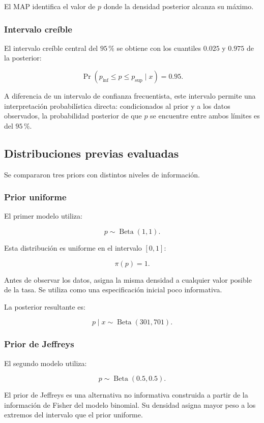 El MAP identifica el valor de \(p\) donde la densidad posterior alcanza
su máximo.

\subsubsection{Intervalo creíble}

El intervalo creíble central del \(95\,\%\) se obtiene con los cuantiles
\(0.025\) y \(0.975\) de la posterior:

\[
\Pr
\left(
    p_{\mathrm{inf}}
    \leq
    p
    \leq
    p_{\mathrm{sup}}
    \mid x
\right)
=
0.95.
\]

A diferencia de un intervalo de confianza frecuentista, este intervalo
permite una interpretación probabilística directa: condicionados al
prior y a los datos observados, la probabilidad posterior de que \(p\)
se encuentre entre ambos límites es del \(95\,\%\).

\subsection{Distribuciones previas evaluadas}

Se compararon tres priors con distintos niveles de información.

\subsubsection{Prior uniforme}

El primer modelo utiliza:

\[
p
\sim
\operatorname{Beta}(1,1).
\]

Esta distribución es uniforme en el intervalo \([0,1]\):

\[
\pi(p)=1.
\]

Antes de observar los datos, asigna la misma densidad a cualquier valor
posible de la tasa. Se utiliza como una especificación inicial poco
informativa.

La posterior resultante es:

\[
p\mid x
\sim
\operatorname{Beta}(301,701).
\]

\subsubsection{Prior de Jeffreys}

El segundo modelo utiliza:

\[
p
\sim
\operatorname{Beta}(0.5,0.5).
\]

El prior de Jeffreys es una alternativa no informativa construida a
partir de la información de Fisher del modelo binomial. Su densidad
asigna mayor peso a los extremos del intervalo que el prior uniforme.

